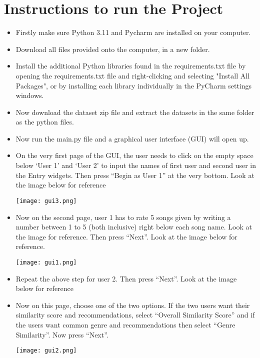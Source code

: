 \documentclass[fontsize=11pt]{article}
\begin{document}
\section*{Instructions to run the Project}
\begin{itemize}
    \item Firstly make sure Python 3.11 and Pycharm are installed on your computer.
    \item Download all files provided onto the computer, in a new folder.
    \item Install the additional Python libraries found in the requirements.txt file by opening the requirements.txt file and right-clicking and selecting "Install All Packages", or by installing each library individually in the PyCharm settings windows.
    \item Now download the dataset zip file and extract the datasets in the same folder as the python files.
    \item Now run the main.py file and a graphical user interface (GUI) will open up. 
    \item On the very first page of the GUI, the user needs to click on the empty space below ‘User 1’ and ‘User 2’ to input the names of first user and second user in the Entry widgets. Then press “Begin as User 1” at the very bottom. Look at the image below for reference
    
    \centering
    \texttt{[image: gui3.png]}
    \label{fig:GUI}
    
    \item Now on the second page, user 1 has to rate 5 songs given by writing a number between 1 to 5 (both inclusive) right below each song name. Look at the image for reference. Then press “Next”. Look at the image below for reference.
    
    \centering
    \texttt{[image: gui1.png]}
    \label{fig:GUI}
    
    \item Repeat the above step for user 2. Then press “Next”.  Look at the image below for reference 
    
    
    \item Now on this page, choose one of the two options. If the two users want their similarity score and recommendations, select “Overall Similarity Score” and if the users want common genre and recommendations then select “Genre Similarity”. Now press “Next”.

    \centering
    \texttt{[image: gui2.png]}
    \label{fig:GUI}
    

\end{itemize}
\end{document}
